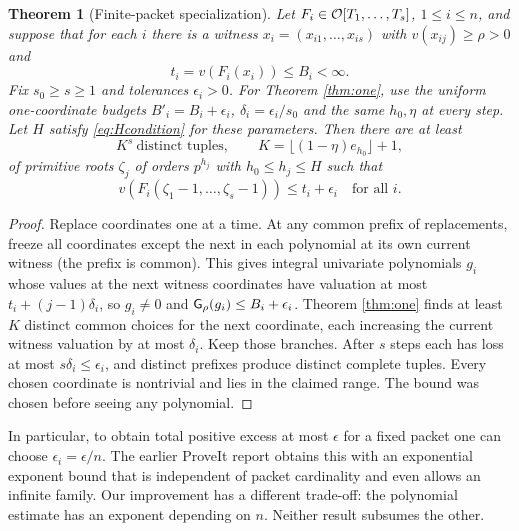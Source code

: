 \documentclass[11pt]{article}
\newtheorem{theorem}{Theorem}[section]
\theoremstyle{remark}\newtheorem{remark}[theorem]{Remark}
\begin{document}
\begin{theorem}[Finite-packet specialization]\label{thm:multi}
Let $F_i\in\mathcal O[T_1,\ldots,T_s]$, $1\le i\le n$, and suppose that
for each $i$ there is a witness $x_i=(x_{i1},\ldots,x_{is})$ with
$v(x_{ij})\ge\rho>0$ and
\[
 t_i=v(F_i(x_i))\le B_i<\infty.
\]
Fix $s_0\ge s\ge1$ and tolerances $\epsilon_i>0$. For
Theorem \ref{thm:one}, use the uniform one-coordinate budgets
$B'_i=B_i+\epsilon_i$, $\delta_i=\epsilon_i/s_0$ and the same
$h_0,\eta$ at every step. Let $H$ satisfy \eqref{eq:Hcondition} for
these parameters. Then there are at least
\[
 K^s\ \text{distinct tuples},\qquad
 K=\lfloor(1-\eta)e_{h_0}\rfloor+1,
\]
of primitive roots $\zeta_j$ of orders $p^{h_j}$ with $h_0\le h_j\le H$
such that
\[
 v(F_i(\zeta_1-1,\ldots,\zeta_s-1))\le t_i+\epsilon_i
 \quad\text{for all $i$.}
\]
\end{theorem}
\begin{proof}
Replace coordinates one at a time. At any common prefix of replacements,
freeze all coordinates except the next in each polynomial at its own
current witness (the prefix is common). This gives integral univariate
polynomials $g_i$ whose values at the next witness coordinates have
valuation at most $t_i+(j-1)\delta_i$, so $g_i\ne0$ and
$\mathsf G_\rho(g_i)\le B_i+\epsilon_i$. Theorem \ref{thm:one} finds
at least $K$ distinct common choices for the next coordinate, each
increasing the current witness valuation by at most $\delta_i$.
Keep those branches. After $s$ steps each has loss at most
$s\delta_i\le\epsilon_i$, and distinct prefixes produce distinct
complete tuples. Every chosen coordinate is nontrivial and lies in
the claimed range. The bound was chosen before seeing any polynomial.
\end{proof}

In particular, to obtain total positive excess at most $\epsilon$ for a
fixed packet one can choose $\epsilon_i=\epsilon/n$. The earlier
ProveIt report obtains this with an exponential exponent bound that is
independent of packet cardinality and even allows an infinite family.
Our improvement has a different trade-off: the polynomial estimate has
an exponent depending on $n$. Neither result subsumes the other.
\end{document}
